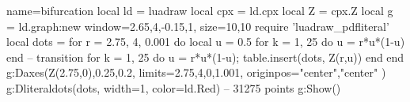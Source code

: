 \begin{luadraw}{name=bifurcation}
local ld = luadraw
local cpx = ld.cpx
local Z = cpx.Z
local g = ld.graph:new{ window={2.65,4,-0.15,1}, size={10,10} }
require 'luadraw_pdfliteral'
local dots = {}
for r = 2.75, 4, 0.001 do
    local u = 0.5
    for k = 1, 25 do u = r*u*(1-u) end -- transition
    for k = 1, 25 do u = r*u*(1-u); table.insert(dots, Z(r,u)) end
end
g:Daxes({Z(2.75,0),0.25,0.2}, {limits={{2.75,4},{0,1.001}}, originpos={"center","center"} })
g:Dliteraldots(dots, {width=1, color=ld.Red}) -- 31275 points
g:Show()
\end{luadraw}
